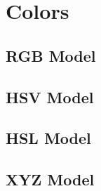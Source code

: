 \section{Colors}


\subsection{RGB Model}

\subsection{HSV Model}

\subsection{HSL Model}

\subsection{XYZ Model}

